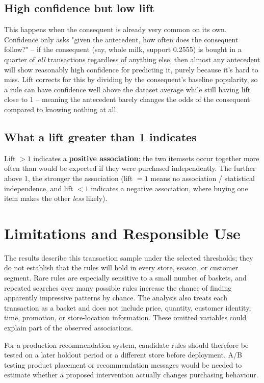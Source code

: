 \documentclass[12pt,a4paper]{article}
\begin{document}
\subsection{High confidence but low lift}
This happens when the consequent is already very common on its own. Confidence only asks
"given the antecedent, how often does the consequent follow?" -- if the consequent (say,
whole milk, support 0.2555) is bought in a quarter of \emph{all} transactions regardless of
anything else, then almost any antecedent will show reasonably high confidence for
predicting it, purely because it's hard to miss. Lift corrects for this by dividing by the
consequent's baseline popularity, so a rule can have confidence well above the dataset
average while still having lift close to 1 -- meaning the antecedent barely changes the
odds of the consequent compared to knowing nothing at all.

\subsection{What a lift greater than 1 indicates}
Lift $> 1$ indicates a \textbf{positive association}: the two itemsets occur together more
often than would be expected if they were purchased independently. The further above 1, the
stronger the association (lift $= 1$ means no association / statistical independence, and
lift $< 1$ indicates a negative association, where buying one item makes the other
\emph{less} likely).

\clearpage
\section{Limitations and Responsible Use}

The results describe this transaction sample under the selected thresholds; they do not
establish that the rules will hold in every store, season, or customer segment. Rare rules
are especially sensitive to a small number of baskets, and repeated searches over many
possible rules increase the chance of finding apparently impressive patterns by chance.
The analysis also treats each transaction as a basket and does not include price, quantity,
customer identity, time, promotion, or store-location information. These omitted variables
could explain part of the observed associations.

For a production recommendation system, candidate rules should therefore be tested on a
later holdout period or a different store before deployment. A/B testing product placement
or recommendation messages would be needed to estimate whether a proposed intervention
actually changes purchasing behaviour.
\end{document}
